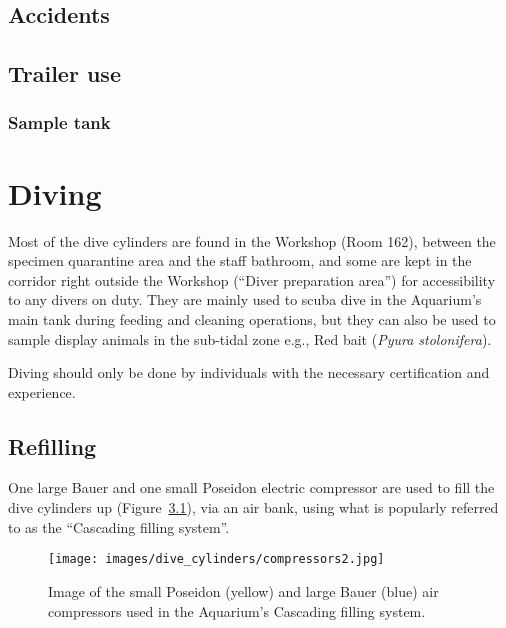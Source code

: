 \documentclass[
  letterpaper,
  DIV=11,
  numbers=noendperiod]{scrreprt}
\begin{document}
\hypertarget{accidents}{%
\section{Accidents}\label{accidents}}

\hypertarget{trailer-use}{%
\section{Trailer use}\label{trailer-use}}

\hypertarget{sec-sam-tank}{%
\subsection{Sample tank}\label{sec-sam-tank}}

\hypertarget{diving}{%
\chapter{Diving}\label{diving}}

Most of the dive cylinders are found in the Workshop (Room 162), between
the specimen quarantine area and the staff bathroom, and some are kept
in the corridor right outside the Workshop (``Diver preparation area'')
for accessibility to any divers on duty. They are mainly used to scuba
dive in the Aquarium's main tank during feeding and cleaning operations,
but they can also be used to sample display animals in the sub-tidal
zone e.g., Red bait (\emph{Pyura stolonifera}).

{Diving should only be done by individuals with the necessary
certification and experience}.

\hypertarget{refilling}{%
\section{Refilling}\label{refilling}}

One large Bauer and one small Poseidon electric compressor are used to
fill the dive cylinders up (Figure~\ref{fig-compressors}), via an air
bank, using what is popularly referred to as the ``Cascading filling
system''.

\begin{figure}[H]

{\centering \texttt{[image: images/dive\_cylinders/compressors2.jpg]}

}

\caption{\label{fig-compressors}Image of the small Poseidon (yellow) and
large Bauer (blue) air compressors used in the Aquarium's Cascading
filling system.}

\end{figure}
\end{document}
